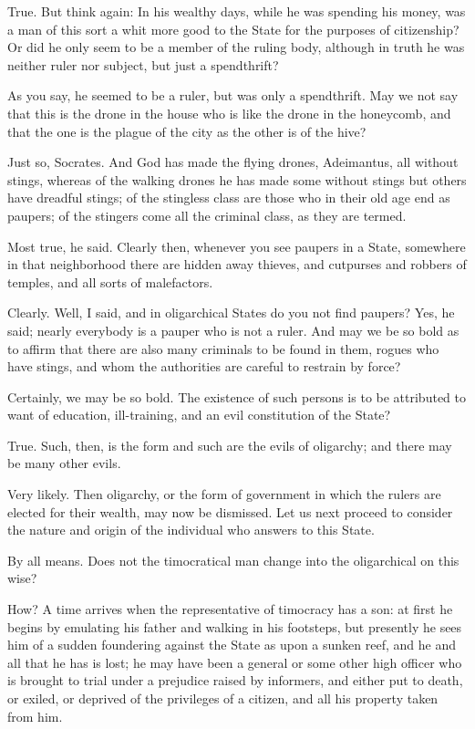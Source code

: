 True.
But think again: In his wealthy days, while he was spending his money, was a man of this sort a whit more good to the State for the purposes of citizenship? Or did he only seem to be a member of the ruling body, although in truth he was neither ruler nor subject, but just a spendthrift?

As you say, he seemed to be a ruler, but was only a spendthrift.
May we not say that this is the drone in the house who is like the drone in the honeycomb, and that the one is the plague of the city as the other is of the hive?

Just so, Socrates.
And God has made the flying drones, Adeimantus, all without stings, whereas of the walking drones he has made some without stings but others have dreadful stings; of the stingless class are those who in their old age end as paupers; of the stingers come all the criminal class, as they are termed.

Most true, he said.
Clearly then, whenever you see paupers in a State, somewhere in that neighborhood there are hidden away thieves, and cutpurses and robbers of temples, and all sorts of malefactors.

Clearly.
Well, I said, and in oligarchical States do you not find paupers?
Yes, he said; nearly everybody is a pauper who is not a ruler.
And may we be so bold as to affirm that there are also many criminals to be found in them, rogues who have stings, and whom the authorities are careful to restrain by force?

Certainly, we may be so bold.
The existence of such persons is to be attributed to want of education, ill-training, and an evil constitution of the State?

True.
Such, then, is the form and such are the evils of oligarchy; and there may be many other evils.

Very likely.
Then oligarchy, or the form of government in which the rulers are elected for their wealth, may now be dismissed. Let us next proceed to consider the nature and origin of the individual who answers to this State.

By all means.
Does not the timocratical man change into the oligarchical on this wise?

How?
A time arrives when the representative of timocracy has a son: at first he begins by emulating his father and walking in his footsteps, but presently he sees him of a sudden foundering against the State as upon a sunken reef, and he and all that he has is lost; he may have been a general or some other high officer who is brought to trial under a prejudice raised by informers, and either put to death, or exiled, or deprived of the privileges of a citizen, and all his property taken from him.

